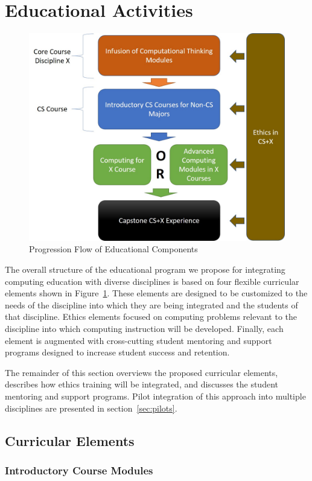 \section{Educational Activities}
\label{sec:approach}

\begin{figure}
\centerline{\includegraphics[width=.45\textwidth]{Picture1.jpg}}
\caption{Progression Flow of Educational Components}
\label{fig:structure}
\end{figure}
The overall structure of the educational program we propose for integrating computing education with diverse disciplines is based on four flexible curricular elements shown in Figure~\ref{fig:structure}. These elements are designed to be customized to the needs of the  discipline into which they are being integrated and the students of that discipline. Ethics elements focused on computing problems relevant to the discipline into which computing instruction will be developed. Finally, each element is augmented with cross-cutting student mentoring and support programs designed to increase student success and retention. 

The remainder of this section overviews the proposed curricular elements, describes how ethics training will be integrated, and discusses the student mentoring and support programs. Pilot integration of this approach into multiple disciplines are presented in section~\ref{sec:pilots}.

\subsection{Curricular Elements}
\subsubsection{Introductory Course Modules}

